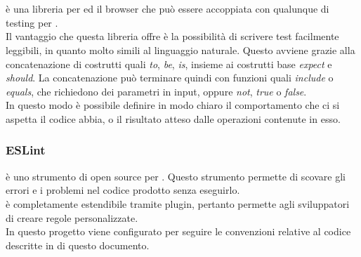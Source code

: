 \paragraph{}\mbox{}\\
 è una libreria  per  ed il browser che può essere accoppiata con qualunque  di testing per .\\
Il vantaggio che questa libreria offre è la possibilità di scrivere test facilmente leggibili, in quanto molto simili al linguaggio naturale. Questo avviene grazie alla concatenazione di costrutti quali \textit{to}, \textit{be}, \textit{is}, insieme ai costrutti base \textit{expect} e \textit{should}. La concatenazione può terminare quindi con funzioni quali \textit{include} o \textit{equals}, che richiedono dei parametri in input, oppure \textit{not}, \textit{true} o \textit{false}.\\
In questo modo è possibile definire in modo chiaro il comportamento che ci si aspetta il codice abbia, o il risultato atteso dalle operazioni contenute in esso.

\subsubsection{ESLint} \label{sec:eslint}
 è uno strumento di  open source per . Questo strumento permette di scovare gli errori e i problemi nel codice prodotto senza eseguirlo.\\  è completamente estendibile tramite plugin, pertanto permette agli sviluppatori di creare regole personalizzate.\\
In questo progetto  viene configurato per seguire le convenzioni relative al codice descritte in  di questo documento.
